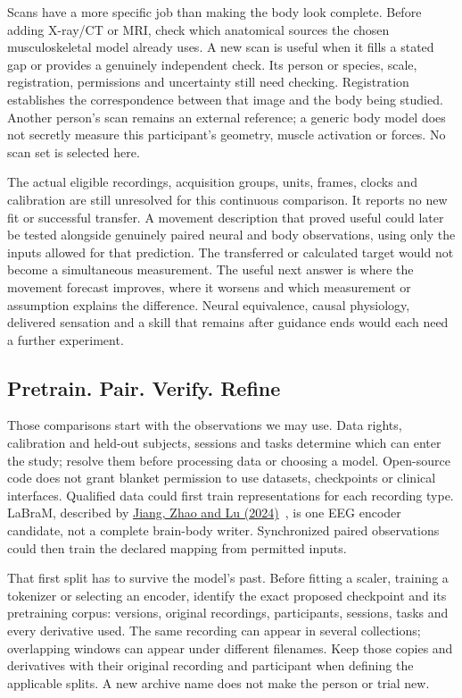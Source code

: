 Scans have a more specific job than making the body look complete. Before adding X-ray/CT or MRI, check which anatomical sources the chosen musculoskeletal model already uses. A new scan is useful when it fills a stated gap or provides a genuinely independent check. Its person or species, scale, registration, permissions and uncertainty still need checking. Registration establishes the correspondence between that image and the body being studied. Another person's scan remains an external reference; a generic body model does not secretly measure this participant's geometry, muscle activation or forces. No scan set is selected here.

The actual eligible recordings, acquisition groups, units, frames, clocks and calibration are still unresolved for this continuous comparison. It reports no new fit or successful transfer. A movement description that proved useful could later be tested alongside genuinely paired neural and body observations, using only the inputs allowed for that prediction. The transferred or calculated target would not become a simultaneous measurement. The useful next answer is where the movement forecast improves, where it worsens and which measurement or assumption explains the difference. Neural equivalence, causal physiology, delivered sensation and a skill that remains after guidance ends would each need a further experiment.

\subsection{Pretrain. Pair. Verify. Refine}
Those comparisons start with the observations we may use. Data rights,
calibration and held-out subjects, sessions and tasks determine which can
enter the study; resolve them before processing data or choosing a model.
Open-source code does not grant blanket permission to use datasets,
checkpoints or clinical interfaces. Qualified data could first train
representations for each recording type. LaBraM, described by \href{https://arxiv.org/html/2405.18765v1}{Jiang, Zhao and Lu (2024)}~\cite{labram2024}, is one EEG encoder
candidate, not a complete brain-body writer. Synchronized paired observations could
then train the declared mapping from permitted inputs.

That first split has to survive the model's past. Before fitting a scaler,
training a tokenizer or selecting an encoder, identify the exact proposed
checkpoint and its pretraining corpus: versions, original recordings,
participants, sessions, tasks and every derivative used. The same recording
can appear in several collections; overlapping windows can appear under
different filenames. Keep those copies and derivatives with their original
recording and participant when defining the applicable splits. A new archive
name does not make the person or trial new.

